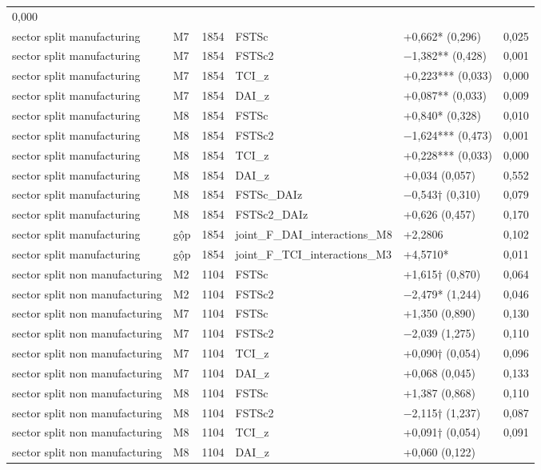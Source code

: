 \documentclass[12pt,a4paper]{article}
\begin{document}
\begin{longtable}[]{@{}llllll@{}}
0,000 \\
sector split manufacturing & M7 & 1854 & FSTSc & +0,662* (0,296) &
0,025 \\
sector split manufacturing & M7 & 1854 & FSTSc2 & −1,382** (0,428) &
0,001 \\
sector split manufacturing & M7 & 1854 & TCI\_z & +0,223*** (0,033) &
0,000 \\
sector split manufacturing & M7 & 1854 & DAI\_z & +0,087** (0,033) &
0,009 \\
sector split manufacturing & M8 & 1854 & FSTSc & +0,840* (0,328) &
0,010 \\
sector split manufacturing & M8 & 1854 & FSTSc2 & −1,624*** (0,473) &
0,001 \\
sector split manufacturing & M8 & 1854 & TCI\_z & +0,228*** (0,033) &
0,000 \\
sector split manufacturing & M8 & 1854 & DAI\_z & +0,034 (0,057) &
0,552 \\
sector split manufacturing & M8 & 1854 & FSTSc\_DAIz & −0,543† (0,310) &
0,079 \\
sector split manufacturing & M8 & 1854 & FSTSc2\_DAIz & +0,626 (0,457) &
0,170 \\
sector split manufacturing & gộp & 1854 &
joint\_F\_DAI\_interactions\_M8 & +2,2806 & 0,102 \\
sector split manufacturing & gộp & 1854 &
joint\_F\_TCI\_interactions\_M3 & +4,5710* & 0,011 \\
sector split non manufacturing & M2 & 1104 & FSTSc & +1,615† (0,870) &
0,064 \\
sector split non manufacturing & M2 & 1104 & FSTSc2 & −2,479* (1,244) &
0,046 \\
sector split non manufacturing & M7 & 1104 & FSTSc & +1,350 (0,890) &
0,130 \\
sector split non manufacturing & M7 & 1104 & FSTSc2 & −2,039 (1,275) &
0,110 \\
sector split non manufacturing & M7 & 1104 & TCI\_z & +0,090† (0,054) &
0,096 \\
sector split non manufacturing & M7 & 1104 & DAI\_z & +0,068 (0,045) &
0,133 \\
sector split non manufacturing & M8 & 1104 & FSTSc & +1,387 (0,868) &
0,110 \\
sector split non manufacturing & M8 & 1104 & FSTSc2 & −2,115† (1,237) &
0,087 \\
sector split non manufacturing & M8 & 1104 & TCI\_z & +0,091† (0,054) &
0,091 \\
sector split non manufacturing & M8 & 1104 & DAI\_z & +0,060 (0,122) &

\end{longtable}
\end{document}
